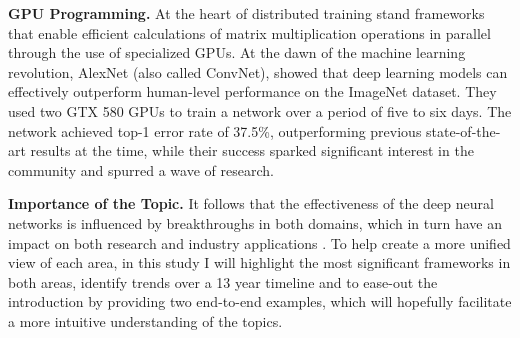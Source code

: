 \textbf{GPU Programming.}
At the heart of distributed training stand frameworks that enable efficient calculations of matrix
multiplication operations in parallel through the use of specialized GPUs. At the dawn of the
machine learning revolution, AlexNet \cite{krizhevsky_imagenet_2012} (also called ConvNet), showed
that deep learning models can effectively outperform human-level performance on the ImageNet
dataset. They used two GTX 580 GPUs to train a network over a period of five to six days. The
network achieved top-1 error rate of 37.5\%, outperforming previous state-of-the-art results at the
time, while their success sparked significant interest in the community and spurred a wave of
research.

\textbf{Importance of the Topic.}
It follows that the effectiveness of the deep neural networks is influenced by breakthroughs in both domains,
which in turn have an impact on both research and industry applications \cite{chahal_hitchhikers_2018, xing_strategies_2015}.
To help create a more unified view of each area, in this study I will highlight the most significant frameworks
in both areas, identify trends over a 13 year timeline and to ease-out the introduction by providing
two end-to-end examples, which will hopefully facilitate a more intuitive understanding of the topics.



